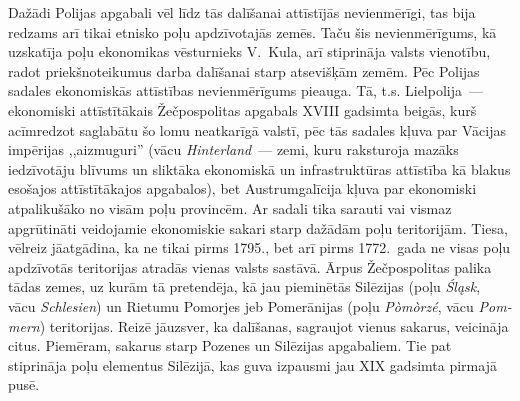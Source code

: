 \documentclass[twoside,a5paper,12pt,fleqn,openany]{extbook}
\newcommand{\pltxti}[1]{\textit{\textpolish{#1}}}
\newcommand{\detxti}[1]{\textit{\textgerman{#1}}}
\begin{document}
Dažādi Polijas apgabali vēl līdz tās dalīšanai attīstījās nevienmērīgi, tas bija redzams arī tikai etnisko poļu apdzīvotajās zemēs. Taču šis nevienmērīgums, kā uzskatīja poļu ekonomikas vēsturnieks V.~Kula, arī stiprināja valsts vienotību, radot priekšnoteikumus darba dalīšanai starp atsevišķām zemēm. Pēc Polijas sadales ekonomiskās attīstības nevienmērīgums pieauga. Tā, t.s. Lielpolija~--- ekonomiski attīstītākais Žečpospolitas apgabals XVIII gadsimta beigās, kurš acīmredzot saglabātu šo lomu neatkarīgā valstī, pēc tās sadales kļuva par Vācijas impērijas ,,aizmuguri'' (vācu \detxti{Hinterland}~--- zemi, kuru raksturoja mazāks iedzīvotāju blīvums un sliktāka ekonomiskā un infrastruktūras attīstība kā blakus esošajos attīstītākajos apgabalos), bet Austrumgalīcija kļuva par ekonomiski atpalikušāko no visām poļu provincēm. Ar sadali tika sarauti vai vismaz apgrūtināti veidojamie ekonomiskie sakari starp dažādām poļu teritorijām. Tiesa, vēlreiz jāatgādina, ka ne tikai pirms 1795., bet arī pirms 1772.~gada ne visas poļu apdzīvotās teritorijas atradās vienas valsts sastāvā. Ārpus Žečpospolitas palika tādas zemes, uz kurām tā pretendēja, kā jau pieminētās Silēzijas (poļu \pltxti{Śląsk}, vācu \detxti{Schlesien}) un Rietumu Pomorjes jeb Pomerānijas (poļu \pltxti{Pòmòrzé}, vācu \detxti{Pommern}) teritorijas. Reizē jāuzsver, ka dalīšanas, sagraujot vienus sakarus, veicināja citus. Piemēram, sakarus starp Pozenes un Silēzijas apgabaliem. Tie pat stiprināja poļu elementus Silēzijā, kas guva izpausmi jau XIX gadsimta pirmajā pusē.
\end{document}
